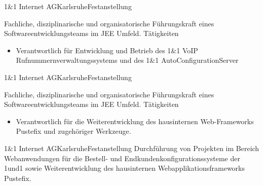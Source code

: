 \documentclass[11pt, a4paper, sans]{moderncv}
\begin{document}



 {1\&1 Internet AG}{Karlsruhe}{Festanstellung}{
Fachliche, disziplinarische und organisatorische Führungskraft eines Softwareentwicklungsteams im JEE Umfeld.
\newline{}\newline{}
Tätigkeiten
\begin{itemize}
\item Verantwortlich für Entwicklung und Betrieb des 1\&1 VoIP Rufnummernverwaltungssystems und des 1\&1 AutoConfigurationServer
\end{itemize}}

 {1\&1 Internet AG}{Karlsruhe}{Festanstellung}{
Fachliche, disziplinarische und organisatorische Führungskraft eines Softwareentwicklungsteams im JEE Umfeld.
\newline{}\newline{}
Tätigkeiten
\begin{itemize}
\item Verantwortlich für die Weiterentwicklung des hausinternen Web-Frameworks Pustefix und zugehöriger Werkzeuge.
\end{itemize}}

 {1\&1 Internet AG}{Karlsruhe}{Festanstellung} {
Durchführung von Projekten im Bereich Webanwendungen für die Bestell- und Endkundenkonfigurationssysteme der 1und1 sowie Weiterentwicklung des hausinternen Webapplikationsframeworks Pustefix.
}
\end{document}
